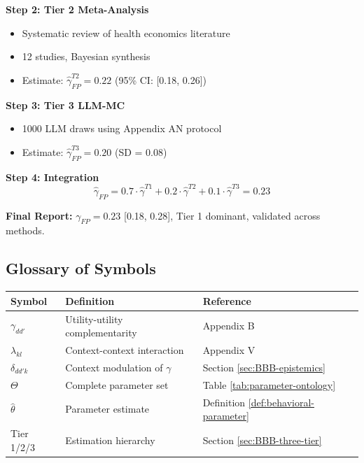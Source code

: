 \textbf{Step 2: Tier 2 Meta-Analysis}
\begin{itemize}[nosep]
    \item Systematic review of health economics literature
    \item 12 studies, Bayesian synthesis
    \item Estimate: $\hat{\gamma}_{FP}^{T2} = 0.22$ (95\% CI: [0.18, 0.26])
\end{itemize}

\textbf{Step 3: Tier 3 LLM-MC}
\begin{itemize}[nosep]
    \item 1000 LLM draws using Appendix AN protocol
    \item Estimate: $\hat{\gamma}_{FP}^{T3} = 0.20$ (SD = 0.08)
\end{itemize}

\textbf{Step 4: Integration}
\begin{equation}
\hat{\gamma}_{FP} = 0.7 \cdot \hat{\gamma}^{T1} + 0.2 \cdot \hat{\gamma}^{T2} + 0.1 \cdot \hat{\gamma}^{T3} = 0.23
\end{equation}

\textbf{Final Report:}
$\gamma_{FP} = 0.23$ [0.18, 0.28], Tier 1 dominant, validated across methods.


\subsection{Glossary of Symbols}
\label{sec:BBB-glossary}

\begin{center}
\renewcommand{\arraystretch}{1.3}
\begin{tabular}{@{}lll@{}}
\toprule
\textbf{Symbol} & \textbf{Definition} & \textbf{Reference} \\
\midrule
$\gamma_{dd'}$ & Utility-utility complementarity & Appendix B \\
$\lambda_{kl}$ & Context-context interaction & Appendix V \\
$\delta_{dd'k}$ & Context modulation of $\gamma$ & Section \ref{sec:BBB-epistemics} \\
$\Theta$ & Complete parameter set & Table \ref{tab:parameter-ontology} \\
$\hat{\theta}$ & Parameter estimate & Definition \ref{def:behavioral-parameter} \\
Tier 1/2/3 & Estimation hierarchy & Section \ref{sec:BBB-three-tier} \\
\bottomrule
\end{tabular}
\end{center}

